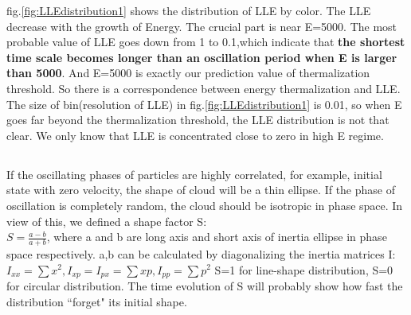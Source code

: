 \documentclass[aps,pre,twocolumn,groupedaddress]{revtex4-1}
\begin{document}
fig.\ref{fig:LLEdistribution1} shows the distribution of LLE by color. The LLE decrease with the growth of Energy. The crucial part is near E=5000. The most probable value of LLE goes down from 1 to 0.1,which indicate that \textbf{the shortest time scale becomes longer than an oscillation period when E is larger than 5000}. And E=5000 is exactly our prediction value of thermalization threshold. So there is a correspondence between energy thermalization and LLE. 
The size of bin(resolution of LLE) in fig.\ref{fig:LLEdistribution1} is 0.01, so when E goes far beyond the thermalization threshold, the LLE distribution is not that clear. We only know that LLE is concentrated close to zero in high E regime.



\subsection{{\color{red}{Shape of Distribution in Phase-space}}}
If the oscillating phases of particles are highly correlated, for example, initial state with zero velocity, the shape of cloud will be a thin ellipse. If the phase of oscillation is completely random, the cloud should be isotropic in phase space. In view of this, we defined a shape factor S:
\\$S=\frac{a-b}{a+b}$, where a and b are long axis and short axis of inertia ellipse in phase space respectively. a,b can be calculated by diagonalizing the inertia matrices I: $I_{xx}=\sum{x^2}, I_{xp}=I_{px}=\sum{xp},I_{pp}=\sum{p^2}$
S=1 for line-shape distribution, S=0 for circular distribution.
The time evolution of S will probably show how fast the distribution ``forget" its initial shape.  
\end{document}
